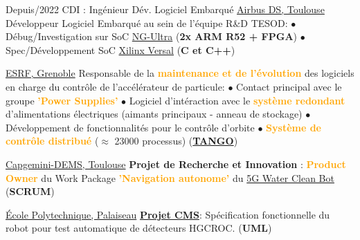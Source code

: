 \documentclass[
	a4paper,
	subsectioncolor=cvblue!70,
]{fortysecondscv}
\newcommand{\tango}{\href{https://www.tango-controls.org/}{TANGO}}
\newcommand{\hl}[1]{\textbf{\textcolor{orange}{#1}}}
\begin{document}
\begin{cvtable}[2]
  \cvitem
      {Depuis/2022}
      {CDI : Ingénieur Dév. Logiciel Embarqué}
      {\href{https://fr.wikipedia.org/wiki/Airbus_Defence_and_Space}{Airbus DS, Toulouse}}
  {
    Développeur Logiciel Embarqué au sein de l'équipe R\&D TESOD:\newline
    $\bullet$ Débug/Investigation sur SoC
    \href{https://nanoxplore.org/index.php/product/ng-ultra/}{NG-Ultra} (\textbf{2x ARM
    R52 + FPGA})\newline
    $\bullet$ Spec/Développement SoC
    \href{https://www.xilinx.com/products/silicon-devices/acap/versal-ai-core.html}{Xilinx
      Versal} (\textbf{C et C++})
  }

  {\href{https://www.esrf.fr/}{ESRF, Grenoble}}
  {
    Responsable de la \hl{maintenance et de l'évolution} des logiciels en charge
    du contrôle de l'accélérateur de particule:\newline
    $\bullet$ Contact principal avec le groupe \hl{'Power Supplies'}\newline
    $\bullet$ Logiciel d'intéraction avec le \hl{système redondant} d'alimentations
    électriques (aimants principaux - anneau de stockage)\newline
    $\bullet$ Développement de fonctionnalités pour le contrôle d'orbite\newline
    $\bullet$ \hl{Système de contrôle distribué} ($\approx$ 23000 processus)
    (\hl{\textbf{\tango}})
  }

  {\href{https://www.capgemini.com/service/digital-services/digital-engineering-and-manufacturing-services/}{Capgemini-DEMS,
      Toulouse}}
  {
    \textbf{Projet de Recherche et Innovation} : \hl{Product Owner} du Work
    Package \hl{'Navigation autonome'} du
    \href{https://www.capgemini.com/fr-fr/solutions/5g-water-clean-bot/}{5G
      Water Clean Bot} (\textbf{SCRUM})
  }

  {\href{https://www.polytechnique.edu/fr/le-laboratoire-leprince-ringuet-llr}{École
      Polytechnique, Palaiseau}}
  {
    \hl{\textbf{\href{http://polywww.in2p3.fr/-cms-45-?lang=fr}{Projet CMS}}}:
    Spécification fonctionnelle du robot pour test automatique de détecteurs
    HGCROC. (\textbf{UML})
  }


\end{cvtable}
\end{document}

